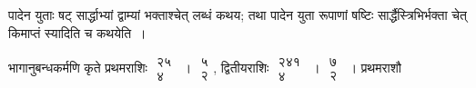 \documentclass[10pt, openany]{book}
\begin{document}
\newpage

{पादेन युताः षट् सार्द्धाभ्यां द्वाम्यां भक्ताश्चेत् लब्धं कथय; तथा
पादेन युता रूपाणां षष्टिः सार्द्धैस्त्रिभिर्भक्ता चेत् किमाप्तं स्यादिति च कथयेति~।}
\vspace{2mm}

{भागानुबन्धकर्मणि कृते प्रथमराशिः $\begin{matrix}

\mbox{{२५}}\\

\mbox{{४}}

\end{matrix}$~। $\begin{matrix}

\mbox{{५}}\\

\mbox{{२}}

\end{matrix}$, द्वितीयराशिः $\begin{matrix}

\mbox{{२४१}}\\

\mbox{{४}}

\end{matrix}$~। $\begin{matrix}

\mbox{{७}}\\

\mbox{{२}}

\end{matrix}$~। प्रथमराशौ}
\end{document}
